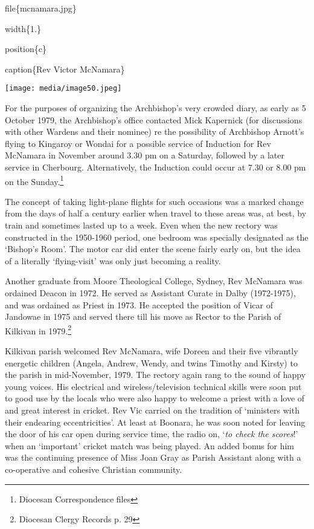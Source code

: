 file\{mcnamara.jpg\}

width\{1.\}

position\{c\}

caption\{Rev Victor McNamara\}

\texttt{[image: media/image50.jpeg]}

For the purposes of organizing the Archbishop's very crowded diary, as early as 5 October 1979, the Archbishop's office contacted Mick Kapernick (for discussions with other Wardens and their nominee) re the possibility of Archbishop Arnott's flying to Kingaroy or Wondai for a possible service of Induction for Rev McNamara in November around 3.30 pm on a Saturday, followed by a later service in Cherbourg. Alternatively, the Induction could occur at 7.30 or 8.00 pm on the Sunday.\footnote{Diocesan Correspondence files}

The concept of taking light-plane flights for such occasions was a marked change from the days of half a century earlier when travel to these areas was, at best, by train and sometimes lasted up to a week. Even when the new rectory was constructed in the 1950-1960 period, one bedroom was specially designated as the `Bishop's Room'. The motor car did enter the scene fairly early on, but the idea of a literally `flying-visit' was only just becoming a reality.

Another graduate from Moore Theological College, Sydney, Rev McNamara was ordained Deacon in 1972. He served as Assistant Curate in Dalby (1972-1975), and was ordained as Priest in 1973. He accepted the position of Vicar of Jandowae in 1975 and served there till his move as Rector to the Parish of Kilkivan in 1979.\footnote{Diocesan Clergy Records p. 29}

Kilkivan parish welcomed Rev McNamara, wife Doreen and their five vibrantly energetic children (Angela, Andrew, Wendy, and twins Timothy and Kirsty) to the parish in mid-November, 1979. The rectory again rang to the sound of happy young voices. His electrical and wireless/television technical skills were soon put to good use by the locals who were also happy to welcome a priest with a love of and great interest in cricket. Rev Vic carried on the tradition of `ministers with their endearing eccentricities'. At least at Boonara, he was soon noted for leaving the door of his car open during service time, the radio on, `\emph{to check the scores}!' when an `important' cricket match was being played. An added bonus for him was the continuing presence of Miss Joan Gray as Parish Assistant along with a co-operative and cohesive Christian community.

